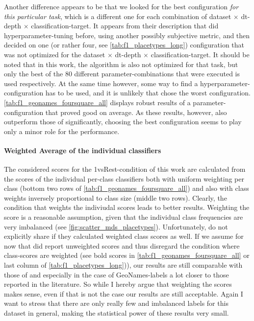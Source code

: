 Another difference appears to be that we looked for the best configuration \textit{for this particular task}, which is a different one for each combination of dataset $\times$ \gls{dt}-depth $\times$ classification-target. It appears from their description that \mainalgos did hyperparameter-tuning before, using another possibly subjective metric, and then decided on one (or rather four, see \autoref{tab:f1_placetypes_long}) configuration that was not optimized for the dataset $\times$ \gls{dt}-depth $\times$ classification-target. It should be noted that in this work, the algorithm is also not optimized for that task, but only the best of the 80 different parameter-combinations that were executed is used respectively. At the same time however, some way to find a hyperparameter-configuration has to be used, and it is unlikely that \mainalgos chose the worst configuration. \autoref{tab:f1_geonames_foursquare_all} displays robust results of a parameter-configuration that proved good on average. As these results, however, also outperform those of \mainalgos significantly, choosing the best configuration seems to play only a minor role for the performance.

\paragraph{Weighted Average of the individual classifiers}

The considered scores for the 1vsRest-condition of this work are calculated from the scores of the individual per-class classifiers both with uniform weighting per class (bottom two rows of \autoref{tab:f1_geonames_foursquare_all}) and also with class weights inversely proportional to class size (middle two rows). Clearly, the condition that weights the indiviudal scores leads to better results. Weighting the score is a reasonable assumption, given that the individual class frequencies are very imbalanced (see \autoref{fig:scatter_mds_placetypes}). Unfortunately, \mainalgos do not explicitly share if they calculated weighted class scores as well. If we assume for now that \mainalgos did report unweighted scores and thus disregard the condition where class-scores are weighted (see bold scores in \autoref{tab:f1_geonames_foursquare_all} or last column of \autoref{tab:f1_placetypes_long})), our results are still comparable with those of \mainalgos and especially in the case of GeoNames-labels a lot closer to those reported in the literature. So while I hereby argue that weighting the scores makes sense, even if that is not the case our results are still acceptable. Again I want to stress that there are only really few and imbalanced labels for this dataset in general, making the statistical power of these results very small.

